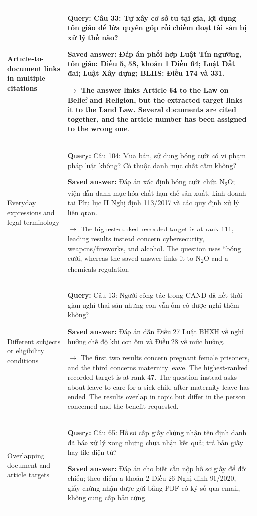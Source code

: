 \begin{longtable}{@{}>{\raggedright\arraybackslash}p{3cm}>{\raggedright\arraybackslash}p{12.25cm}@{}}
\midrule
Article-to-document links in multiple citations &
\textbf{Query:} Câu 33: Tự xây cơ sở tu tại gia, lợi dụng tôn giáo để lừa quyên góp rồi chiếm đoạt tài sản bị xử lý thế nào?\par\smallskip
\textbf{Saved answer:} Đáp án phối hợp Luật Tín ngưỡng, tôn giáo: Điều 5, 58, khoản 1 Điều 64; Luật Đất đai; Luật Xây dựng; BLHS: Điều 174 và 331.\par\smallskip
\(\rightarrow\) The answer links Article 64 to the Law on Belief and Religion, but the extracted target links it to the Land Law. Several documents are cited together, and the article number has been assigned to the wrong one.\\
\midrule
Everyday expressions and legal terminology &
\textbf{Query:} Câu 104: Mua bán, sử dụng bóng cười có vi phạm pháp luật không? Có thuộc danh mục chất cấm không?\par\smallskip
\textbf{Saved answer:} Đáp án xác định bóng cười chứa N\textsubscript{2}O; viện dẫn danh mục hóa chất hạn chế sản xuất, kinh doanh tại Phụ lục II Nghị định 113/2017 và các quy định xử lý liên quan.\par\smallskip
\(\rightarrow\) The highest-ranked recorded target is at rank 111; leading results instead concern cybersecurity, weapons/fireworks, and alcohol. The question uses ``bóng cười, whereas the saved answer links it to N\textsubscript{2}O and a chemicals regulation\\
\midrule
Different subjects or eligibility conditions &
\textbf{Query:} Câu 13: Người công tác trong CAND đã hết thời gian nghỉ thai sản nhưng con vẫn ốm có được nghỉ thêm không?\par\smallskip
\textbf{Saved answer:} Đáp án dẫn Điều 27 Luật BHXH về nghỉ hưởng chế độ khi con ốm và Điều 28 về mức hưởng.\par\smallskip
\(\rightarrow\) The first two results concern pregnant female prisoners, and the third concerns maternity leave. The highest-ranked recorded target is at rank 47. The question instead asks about leave to care for a sick child after maternity leave has ended. The results overlap in topic but differ in the person concerned and the benefit requested.\\
\midrule
Overlapping document and article targets &
\textbf{Query:} Câu 65: Hồ sơ cấp giấy chứng nhận tên định danh đã báo xử lý xong nhưng chưa nhận kết quả; trả bản giấy hay file điện tử?\par\smallskip
\textbf{Saved answer:} Đáp án cho biết cần nộp hồ sơ giấy để đối chiếu; theo điểm a khoản 2 Điều 26 Nghị định 91/2020, giấy chứng nhận được gửi bằng PDF có ký số qua email, không cung cấp bản cứng.\par\smallskip

\end{longtable}
